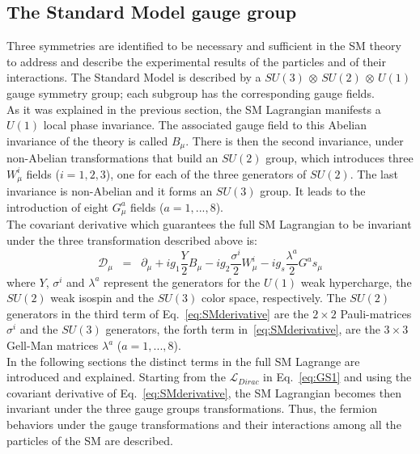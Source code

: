 \subsection{The Standard Model gauge group}\label{sec:gauge group}
Three symmetries are identified to be necessary and sufficient in the SM theory to address and describe the experimental results of the particles and of their interactions. The Standard Model is described by a $SU(3)$ $\otimes$ $SU(2)$ $\otimes$ $U(1)$ gauge symmetry group; each subgroup has the corresponding gauge fields.\\
As it was explained in the previous section, the SM Lagrangian manifests a $U(1)$ local phase invariance. The associated gauge field to this Abelian invariance of the theory is called $B_\mu$. There is then the second invariance, under non-Abelian transformations that build an $SU(2)$ group, which introduces three $W^i_\mu$ fields ($i = 1,2,3$), one for each of the three generators of $SU(2)$. The last invariance is  non-Abelian and it forms an $SU(3)$ group. It leads to the introduction of eight $G^a_\mu$ fields ($a = 1,...,8$).\\
The covariant derivative which guarantees the full SM Lagrangian to be invariant under the three transformation described above is:
\begin{equation}
\label{eq:SMderivative}
\mathcal{D}_{\mu} \;\; = \;\; \partial_{\mu} + ig_1\frac{Y}{2}B_{\mu} - ig_2\frac{\sigma^i}{2}W^i_{\mu} - ig_s\frac{\lambda^a}{2}G^as_{\mu}
\end{equation}
where $Y$, $\sigma^i$ and $\lambda^a$ represent the generators for the $U(1)$ weak hypercharge, the $SU(2)$ weak isospin and the $SU(3)$ color space, respectively. The $SU(2)$ generators in the third term of Eq.~\ref{eq:SMderivative} are the $2\times2$ Pauli-matrices $\sigma^i$ and the $SU(3)$ generators, the forth term in~\ref{eq:SMderivative}, are the $3\times3$ Gell-Man matrices $\lambda^a$ ($a = 1,...,8$).\\

In the following sections the distinct terms in the full SM Lagrange are introduced and explained. Starting from the $\mathcal{L}_{Dirac}$ in Eq.~\ref{eq:GS1} and using the covariant derivative of Eq.~\ref{eq:SMderivative}, the SM Lagrangian becomes then invariant under the three gauge groups transformations. Thus, the fermion behaviors under the gauge transformations and their interactions among all the particles of the SM  are described. 

